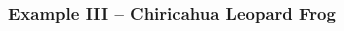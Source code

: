 \documentclass[color=usenames,dvipsnames]{beamer}
\begin{document}
\begin{frame}
  \frametitle{Example III -- Chiricahua Leopard Frog}
  \begin{columns}
    \begin{column}{0.5\textwidth}
    \end{column}
    \begin{column}{0.5\textwidth}
    \end{column}
  \end{columns}
\end{frame}
\end{document}
